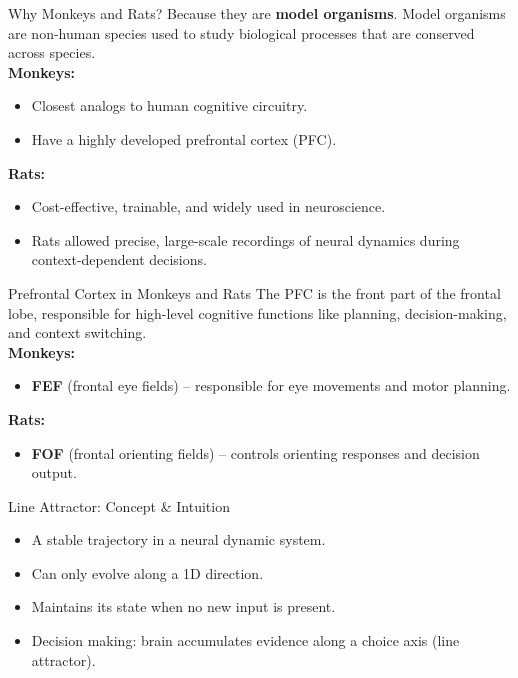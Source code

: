 \documentclass{beamer}
\begin{document}
\begin{frame}{Why Monkeys and Rats?}
    Because they are \textbf{model organisms}. Model organisms are non-human species used to study biological processes that are conserved across species.\\
    \vspace{0.3cm}
    \textbf{Monkeys:}
    \begin{itemize}
        \item Closest analogs to human cognitive circuitry.
        \item Have a highly developed prefrontal cortex (PFC).
    \end{itemize}
    \vspace{0.2cm}
    \textbf{Rats:}
    \begin{itemize}
        \item Cost-effective, trainable, and widely used in neuroscience.
        \item Rats allowed precise, large-scale recordings of neural dynamics during context-dependent decisions.
    \end{itemize}
\end{frame}

\begin{frame}{Prefrontal Cortex in Monkeys and Rats}
    The PFC is the front part of the frontal lobe, responsible for high-level cognitive functions like planning, decision-making, and context switching.\\
    \vspace{0.4cm}
    \textbf{Monkeys:}
    \begin{itemize}
        \item \textbf{FEF} (frontal eye fields) – responsible for eye movements and motor planning.
    \end{itemize}
    \vspace{0.3cm}
    \textbf{Rats:}
    \begin{itemize}
        \item \textbf{FOF} (frontal orienting fields) – controls orienting responses and decision output.
    \end{itemize}
\end{frame}
    
\begin{frame}{Line Attractor: Concept \& Intuition}
    \begin{itemize}
        \item A stable trajectory in a neural dynamic system.
        \item Can only evolve along a 1D direction.
        \item Maintains its state when no new input is present.
        \item Decision making: brain accumulates evidence along a choice axis (line attractor).
    \end{itemize}
\end{frame}
\end{document}
